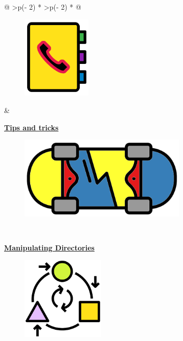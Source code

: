 \documentclass[
  letterpaper,
  DIV=11,
  numbers=noendperiod]{scrreprt}
\begin{document}
\begin{longtable}[]{@{}
  >{\centering\arraybackslash}p{(\columnwidth - 2\tabcolsep) * }
  >{\centering\arraybackslash}p{(\columnwidth - 2\tabcolsep) * }@{}}
\begin{minipage}[t]{\linewidth}
\begin{figure}

{\centering 

\protect\hyperlink{dirsandfiles}{\includegraphics[width=1.30208in,height=\textheight]{figures/directory.png}}

}

\end{figure}
\end{minipage} & \begin{minipage}[t]{\linewidth}\centering
\protect\hyperlink{tipsandtricks}{\textbf{Tips and tricks}}

\begin{figure}

{\centering 

\protect\hyperlink{tipsandtricks}{\includegraphics[width=3.14583in,height=\textheight]{figures/skateboard_trick.png}}

}

\end{figure}
\end{minipage} \\
\begin{minipage}[t]{\linewidth}\centering
\protect\hyperlink{manipulatingdirectories}{\textbf{Manipulating
Directories}}

\begin{figure}

{\centering 

\protect\hyperlink{manipulatingdirectories}{\includegraphics[width=1.5625in,height=\textheight]{figures/transform.png}}

}
\end{figure}
\end{minipage}
\end{longtable}
\end{document}
